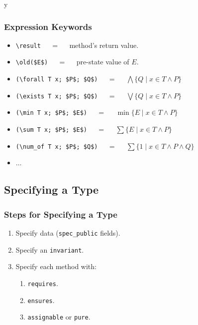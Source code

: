 \if y\MAKEHANDOUTS \documentclass[compress,landscape,handout]{beamer}
\begin{document}
\begin{frame}[fragile]
\frametitle{Expression Keywords}

\begin{itemize}
\item
\lstinline!\result! ~~ = ~~ method's return value.

\item
\lstinline[mathescape=true]!\old($E$)! ~~ = ~~ pre-state value of $E$.

\item
\lstinline[mathescape=true]!(\forall T x; $P$; $Q$)!
~~ = ~~ $\bigwedge \{ Q \mid x \in T \wedge P \}$

\item
\lstinline[mathescape=true]!(\exists T x; $P$; $Q$)!
~~ = ~~ $\bigvee \{ Q \mid x \in T \wedge P \}$

\item
\lstinline[mathescape=true]!(\min T x; $P$; $E$)!
~~ = ~~ $\min \{E \mid x \in T \wedge P \}$

\item
\lstinline[mathescape=true]!(\sum T x; $P$; $E$)!
~~ = ~~ $\sum \{E \mid x \in T \wedge P \}$

\item
\lstinline[mathescape=true]!(\num_of T x; $P$; $Q$)!
~~ = ~~ $\sum \{1 \mid x \in T \wedge P \wedge Q\}$

\item
$\ldots$
\end{itemize}
\end{frame}

\subsection[Exercise]{Specifying a Type}

\begin{frame}[fragile]
\frametitle{Steps for Specifying a Type}

\begin{enumerate}
\item
Specify data (\lstinline!spec_public! fields).

\item
Specify an \lstinline!invariant!.

\item
Specify each method with:

\begin{enumerate}
\item
\lstinline!requires!.

\item
\lstinline!ensures!.

\item
\lstinline!assignable! or \lstinline!pure!.
\end{enumerate}
\end{enumerate}
\end{frame}
\end{document}
